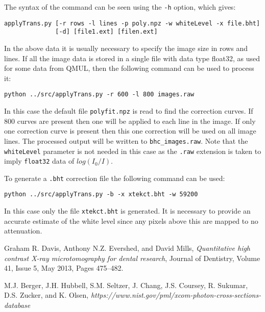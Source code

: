 \documentclass[a4paper,12pt]{article}
\begin{document}
The syntax of the command can be seen using the \texttt{-h} option, which gives:
\begin{verbatim}
applyTrans.py [-r rows -l lines -p poly.npz -w whiteLevel -x file.bht]
              [-d] [file1.ext] [filen.ext]
\end{verbatim}
In the above data it is usually necessary to specify the image size in rows and lines.
If all the image data is stored in a single file with data type float32, as used for
some data from QMUL, then the following command can be used to process it:

\begin{verbatim}
python ../src/applyTrans.py -r 600 -l 800 images.raw
\end{verbatim}
In this case the default file \texttt{polyfit.npz} is read to find the correction curves.
If 800 curves are present then one will be applied to each line in the image.
If only one correction curve is present then this one correction will be used on all image lines.
The processed output will be written to \texttt{bhc\_images.raw}.
Note that the \texttt{whiteLevel} parameter is not needed in this case as the \texttt{.raw} extension
is taken to imply \texttt{float32} data of $log(I_0/I)$.

To generate a \texttt{.bht} correction file the following command can be used:
\begin{verbatim}
python ../src/applyTrans.py -b -x xtekct.bht -w 59200
\end{verbatim}
In this case only the file \texttt{xtekct.bht} is generated. It is necessary to provide an accurate estimate
of the white level since any pixels above this are mapped to no attenuation.

\begin{thebibliography}{9}

  Graham R. Davis, Anthony N.Z. Evershed, and David Mills,
  \emph{Quantitative high contrast X-ray microtomography for dental research},
  Journal of Dentistry,
  Volume 41, Issue 5, May 2013, Pages 475–482.

  M.J. Berger, J.H. Hubbell, S.M. Seltzer, J. Chang, J.S. Coursey, R. Sukumar, D.S. Zucker, and K. Olsen,
  \emph{https://www.nist.gov/pml/xcom-photon-cross-sections-database}

\end{thebibliography}
\end{document}
